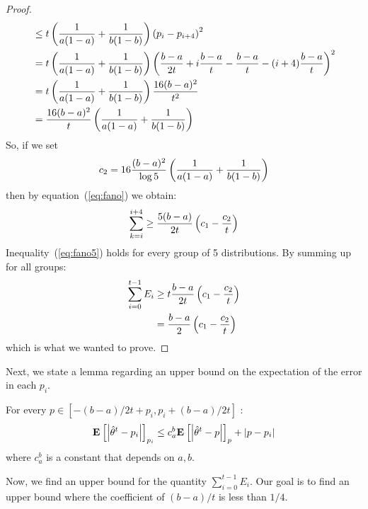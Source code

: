 \begin{proof}
\begin{align*}
    &\leq
    t\left(\frac{1}{a(1-a)} + \frac{1}{b(1-b)}\right) \left(p_i - p_{i+4}\right)^2\\
    &=
    t\left(\frac{1}{a(1-a)} + \frac{1}{b(1-b)}\right)\left(\frac{b-a}{2t} +
    i\frac{b-a}{t} - \frac{b-a}{t} -(i+4)\frac{b-a}{t}\right)^2\\
    &=
    t\left(\frac{1}{a(1-a)} + \frac{1}{b(1-b)}\right) \frac{16(b-a)^2}{t^2}\\
    &=
    \frac{16(b-a)^2}{t} \left(\frac{1}{a(1-a)} + \frac{1}{b(1-b)}\right)
  \end{align*}
  So, if we set
  $$c_2 = 16\frac{(b-a)^2}{\log5}\left(\frac{1}{a(1-a)} + \frac{1}{b(1-b)}\right)$$
  then by equation~(\ref{eq:fano}) we obtain:
  \begin{equation}\label{eq:fano5}
    \sum_{k =i}^{i+4} \geq \frac{5(b-a)}{2t}\left(c_1 - \frac{c_2}{t}\right)
  \end{equation}
  Inequality~(\ref{eq:fano5}) holds for every group of 5
  distributions. By summing up for all groups:
  \begin{align*}
    \sum_{i=0}^{t-1} E_i &\geq t \frac{b-a}{2t}\left(c_1 - \frac{c_2}{t}\right)\\
    &= \frac{b-a}{2}\left(c_1 - \frac{c_2}{t}\right)
  \end{align*}
  which is what we wanted to prove.
\end{proof}

Next, we state a lemma regarding an upper bound on the
expectation of the error in each $p_i$.
\begin{lemma}\label{l:cauchy_schwarz}
  For every $p\in [-(b-a)/{2t} + p_i , p_i + (b-a)/{2t}]$ :
  \[
    \Exp{\lp|\hat{\theta}^t-p_i\rp|}_{p_i}
    \leq c_a^b\Exp{\lp|\hat{\theta}^t-p\rp|}_p + \lp|p - p_i\rp|
  \]
  where $c_a^b$ is a constant that depends on $a,b$.

\end{lemma}
Now, we find an upper bound for the quantity
$\sum_{i=0}^{t-1} E_i$.
Our goal is to find an upper bound where the coefficient of
$(b-a)/t$ is less than $1/4$.

